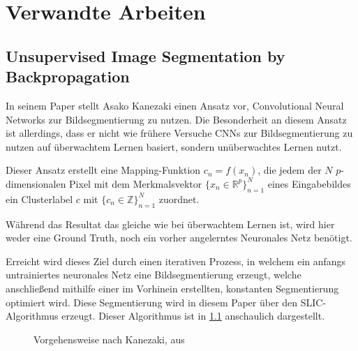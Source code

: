 \chapter{Verwandte Arbeiten}
\label{chap:verwarbeiten}

\section{Unsupervised Image Segmentation by Backpropagation}
\label{sec:kanezaki}
In seinem Paper \cite{kanezaki} stellt Asako Kanezaki einen Ansatz vor, Convolutional Neural Networks zur Bildsegmentierung zu nutzen. Die Besonderheit an diesem Ansatz ist allerdings, dass er nicht wie frühere Versuche CNNs zur Bildsegmentierung zu nutzen auf überwachtem Lernen basiert, sondern unüberwachtes Lernen nutzt.

Dieser Ansatz erstellt eine Mapping-Funktion $c_n=f(x_n)$, die jedem der $N$ $p$-dimensionalen Pixel mit dem Merkmalsvektor $\{x_n\in\mathbb{R}^p\}_{n=1}^N$ eines Eingabebildes ein Clusterlabel $c$ mit $\{c_n\in\mathbb{Z}\}_{n=1}^N$ zuordnet.

Während das Resultat das gleiche wie bei überwachtem Lernen ist, wird hier weder eine Ground Truth, noch ein vorher angelerntes Neuronales Netz benötigt.

Erreicht wird dieses Ziel durch einen iterativen Prozess, in welchem ein anfangs untrainiertes neuronales Netz eine Bildsegmentierung erzeugt, welche anschließend mithilfe einer im Vorhinein erstellten, konstanten Segmentierung optimiert wird. Diese Segmentierung wird in diesem Paper über den SLIC-Algorithmus\cite{slic} erzeugt. Dieser Algorithmus ist in \ref{fig:kanezaki_flowchart} anschaulich dargestellt.

\begin{figure}
	\caption{Vorgehensweise nach Kanezaki, aus \cite{kanezaki}}
	\label{fig:kanezaki_flowchart}
\end{figure}